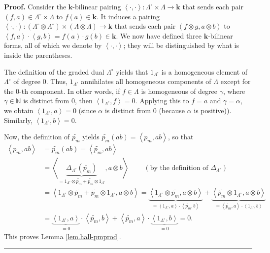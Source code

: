\documentclass[numbers=enddot,12pt,final,onecolumn,notitlepage]{scrartcl}%
\theoremstyle{definition}
\newenvironment{proof}[1][Proof]{\noindent\textbf{#1.} }{\ \rule{0.5em}{0.5em}}
\newenvironment{verlong}{}{}
\begin{document}
\begin{verlong}
\begin{proof}
Consider the $\mathbf{k}$-bilinear pairing $\left\langle \cdot,\cdot
\right\rangle :\Lambda^{\circ}\times\Lambda\rightarrow\mathbf{k}$ that sends
each pair $\left(  f,a\right)  \in\Lambda^{\circ}\times\Lambda$ to $f\left(
a\right)  \in\mathbf{k}$. It induces a pairing $\left\langle \cdot
,\cdot\right\rangle :\left(  \Lambda^{\circ}\otimes\Lambda^{\circ}\right)
\times\left(  \Lambda\otimes\Lambda\right)  \rightarrow\mathbf{k}$ that sends
each pair $\left(  f\otimes g,a\otimes b\right)  $ to $\left\langle
f,a\right\rangle \cdot\left\langle g,b\right\rangle =f\left(  a\right)  \cdot
g\left(  b\right)  \in\mathbf{k}$. We now have defined three $\mathbf{k}%
$-bilinear forms, all of which we denote by $\left\langle \cdot,\cdot
\right\rangle $; they will be distinguished by what is inside the parentheses.

The definition of the graded dual $\Lambda^{\circ}$ yields that $1_{\Lambda
^{\circ}}$ is a homogeneous element of $\Lambda^{\circ}$ of degree $0$. Thus,
$1_{\Lambda^{\circ}}$ annihilates all homogeneous components of $\Lambda$
except for the $0$-th component. In other words, if $f\in\Lambda$ is
homogeneous of degree $\gamma$, where $\gamma\in\mathbb{N}$ is distinct from
$0$, then $\left\langle 1_{\Lambda^{\circ}},f\right\rangle =0$. Applying this
to $f=a$ and $\gamma=\alpha$, we obtain $\left\langle 1_{\Lambda^{\circ}%
},a\right\rangle =0$ (since $\alpha$ is distinct from $0$ (because $\alpha$ is
positive)). Similarly, $\left\langle 1_{\Lambda^{\circ}},b\right\rangle =0$.

Now, the definition of $\widetilde{p_{m}}$ yields $\widetilde{p_{m}}\left(
ab\right)  =\left\langle p_{m},ab\right\rangle $, so that%
\begin{align*}
\left\langle p_{m},ab\right\rangle  &  =\widetilde{p_{m}}\left(  ab\right)
=\left\langle \widetilde{p_{m}},ab\right\rangle \\
&  =\left\langle \underbrace{\Delta_{\Lambda^{\circ}}\left(  \widetilde{p_{m}%
}\right)  }_{=1_{\Lambda^{\circ}}\otimes\widetilde{p_{m}}+\widetilde{p_{m}%
}\otimes1_{\Lambda^{\circ}}},a\otimes b\right\rangle
\ \ \ \ \ \ \ \ \ \ \left(  \text{by the definition of }\Delta_{\Lambda
^{\circ}}\right) \\
&  =\left\langle 1_{\Lambda^{\circ}}\otimes\widetilde{p_{m}}+\widetilde{p_{m}%
}\otimes1_{\Lambda^{\circ}},a\otimes b\right\rangle =\underbrace{\left\langle
1_{\Lambda^{\circ}}\otimes\widetilde{p_{m}},a\otimes b\right\rangle
}_{=\left\langle 1_{\Lambda^{\circ}},a\right\rangle \cdot\left\langle
\widetilde{p_{m}},b\right\rangle }+\underbrace{\left\langle \widetilde{p_{m}%
}\otimes1_{\Lambda^{\circ}},a\otimes b\right\rangle }_{=\left\langle
\widetilde{p_{m}},a\right\rangle \cdot\left\langle 1_{\Lambda^{\circ}%
},b\right\rangle }\\
&  =\underbrace{\left\langle 1_{\Lambda^{\circ}},a\right\rangle }_{=0}%
\cdot\left\langle \widetilde{p_{m}},b\right\rangle +\left\langle
\widetilde{p_{m}},a\right\rangle \cdot\underbrace{\left\langle 1_{\Lambda
^{\circ}},b\right\rangle }_{=0}=0.
\end{align*}
This proves Lemma \ref{lem.hall-pmprod}.
\end{proof}
\end{verlong}
\end{document}
